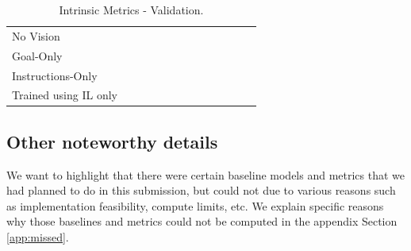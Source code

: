 \documentclass[11pt,a4paper]{article}
\begin{document}
\begin{table}[]
{\begin{tabular}{@{}lllllllllllll@{}}
No Vision             &                           &                           &                           &                           &           & \multicolumn{1}{l|}{}             &                           &                           &                           &                           &           &              \\
Goal-Only             &                           &                           &                           &                           &           & \multicolumn{1}{l|}{}             &                           &                           &                           &                           &           &              \\
Instructions-Only     &                           &                           &                           &                           &           & \multicolumn{1}{l|}{}             &                           &                           &                           &                           &           &              \\
Trained using IL only &                           &                           &                           &                           &           & \multicolumn{1}{l|}{}             &                           &                           &                           &                           &           &              \\ \bottomrule
\end{tabular}%
}
\caption{Intrinsic Metrics - Validation.}
\label{tab:intrinsic}
\end{table}


\subsection{Other noteworthy details}
We want to highlight that there were certain baseline models and metrics that we had planned to do in this submission, but could not due to various reasons such as implementation feasibility, compute limits, etc. We explain specific reasons why those baselines and metrics could not be computed in the appendix Section \ref{app:missed}.
\end{document}
